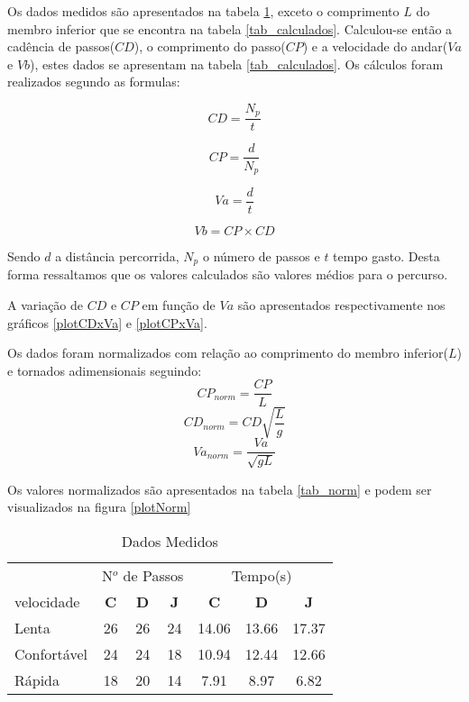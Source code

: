 \documentclass[a4paper,10pt]{article}
\begin{document}
Os dados medidos são apresentados na tabela \ref{tab_medidas}, exceto o comprimento $L$ do membro inferior que se encontra na tabela \ref{tab_calculados}. Calculou-se então a cadência de passos($CD$), o comprimento do passo($CP$) e a velocidade do andar($Va$ e $Vb$), estes dados se apresentam na tabela \ref{tab_calculados}. Os cálculos foram realizados segundo as formulas:

\begin{equation}
\label{eq_CD}
 CD = \frac{N_p}{t}
\end{equation}

\begin{equation}
\label{eq_CP}
CP = \frac{d}{N_p}
\end{equation}

\begin{equation}
 \label{eq_Va}
 Va = \frac{d}{t}
\end{equation}

\begin{equation}
\label{eq_Vb}
Vb = CP \times CD 
\end{equation}

Sendo $d$ a distância percorrida, $N_p$ o número de passos e $t$ tempo gasto. Desta forma ressaltamos que os valores calculados são valores médios para o percurso.

A variação de $CD$ e $CP$ em função de $Va$ são apresentados respectivamente nos gráficos \ref{plotCDxVa} e \ref{plotCPxVa}.

Os dados foram normalizados com relação ao comprimento do membro inferior($L$) e tornados adimensionais seguindo:
\begin{equation}
CP_{norm} = \frac{CP}{L}
\end{equation}
\begin{equation}
CD_{norm} = CD \sqrt{\frac{L}{g}}
\end{equation}
\begin{equation}
Va_{norm} = \frac{Va}{\sqrt{gL}}
\end{equation}


Os valores normalizados são apresentados na tabela \ref{tab_norm} e podem ser visualizados na
figura \ref{plotNorm}

\begin{table}
\begin{center}
\begin{tabular}{l|ccc|ccc}
 & \multicolumn{3}{|c|}{N$^o$ de Passos} & \multicolumn{3}{|c}{Tempo(s)}\\
 velocidade & \textbf{C} & \textbf{D} & \textbf{J} & \textbf{C} & \textbf{D} & \textbf{J}\\
 \hline
Lenta & 26 & 26 & 24 & 14.06 & 13.66 & 17.37\\
Confortável & 24 & 24 & 18 & 10.94 & 12.44 & 12.66\\
Rápida & 18 & 20 & 14 & 7.91 & 8.97 & 6.82
\end{tabular}
\end{center}
\caption{Dados Medidos}
\label{tab_medidas}
\end{table}
\end{document}
